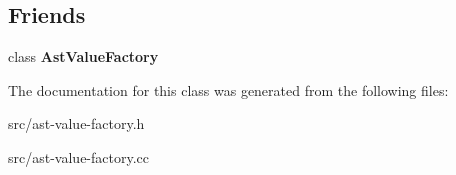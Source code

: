 \subsection*{Friends}
\begin{DoxyCompactItemize}
\item 
\hypertarget{classv8_1_1internal_1_1_ast_value_a1d507e13f196677ce9bdd7b29efd96c0}{}class {\bfseries Ast\+Value\+Factory}\label{classv8_1_1internal_1_1_ast_value_a1d507e13f196677ce9bdd7b29efd96c0}

\end{DoxyCompactItemize}


The documentation for this class was generated from the following files\+:\begin{DoxyCompactItemize}
\item 
src/ast-\/value-\/factory.\+h\item 
src/ast-\/value-\/factory.\+cc\end{DoxyCompactItemize}
